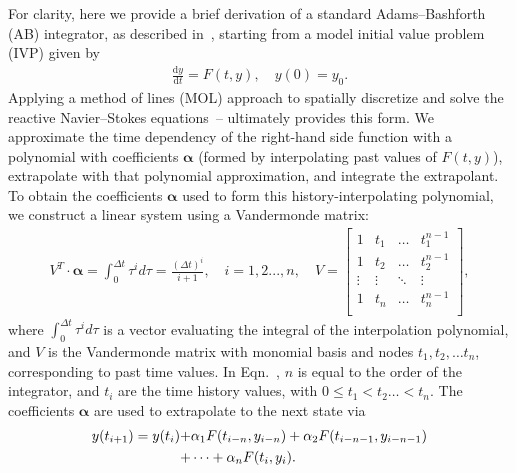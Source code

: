 For clarity, here we provide a brief derivation of a standard Adams--Bashforth (AB)
integrator, as described in~\cite{bashforth1883attempt}, starting from a model initial value problem (IVP)
given by
\begin{align}
\frac{\text{d}y}{\text{d}t} = F(t,y), \quad y(0) = y_{0}. \label{eq:ivp}
\end{align}
Applying a method of lines (MOL) approach to spatially discretize and solve
the reactive Navier--Stokes equations~-- ultimately
provides this form. We approximate the time dependency of the right-hand side function
with a polynomial with coefficients $\boldsymbol{\alpha}$ (formed by interpolating past
values of $F(t,y)$), extrapolate with that polynomial approximation, and integrate
the extrapolant. To obtain the coefficients $\boldsymbol{\alpha}$ used to form this
history-interpolating polynomial, we construct a linear system using a Vandermonde matrix:
\begin{align}
V^{T} \cdot \boldsymbol{\alpha} = \int_0^{\Delta t} \tau^{i} d\tau = \frac{(\Delta t)^{i}}{i+1}, \quad i = 1,2...,n, \quad V = \begin{bmatrix}
    1 & t_{1} &  \hdots   & t_{1}^{n-1}  \\
    1 & t_{2} & \hdots &  t_{2}^{n-1} \\
      \vdots  & \vdots  &  \ddots   &  \vdots   \\
       1 &   t_{n}  &  \hdots  & t_{n}^{n-1} \\
        \end{bmatrix}, \label{eq:vandermonde}
\end{align}
where $\int_0^{\Delta t} \tau^{i} d\tau$ is a vector evaluating the integral of
the interpolation polynomial, and $V$ is the Vandermonde matrix with monomial
basis and nodes $t_{1}, t_{2}, \hdots t_{n}$, corresponding to past time
values. In Eqn.~, $n$ is equal to the order of the integrator,
and $t_{i}$ are the time history values, with $0 \leq t_{1} < t_{2} \hdots <
t_{n}$.  The coefficients $\boldsymbol{\alpha}$ are used to extrapolate to the
next state via
\begin{align}
y(t_{i+1}) = y(t_{i}) +& \alpha_{1}F(t_{i-n},y_{i-n}) + \alpha_{2}F(t_{i-n-1},y_{i-n-1}) \notag \\
+& \cdots + \alpha_{n}F(t_{i},y_{i}). \label{eq:ab_general}
\end{align}

